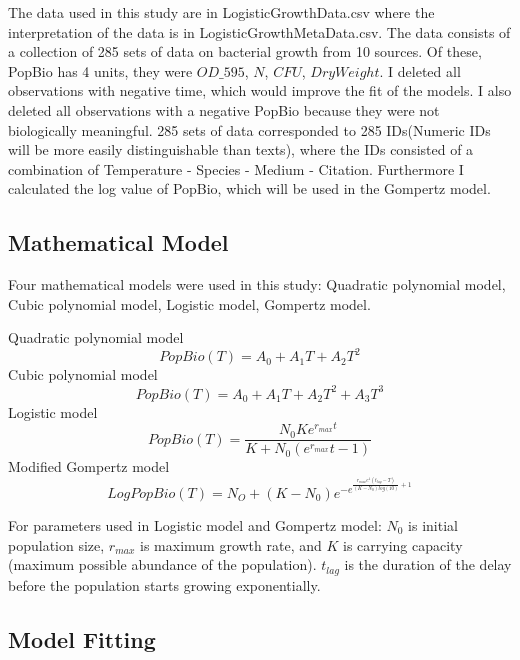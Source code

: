 \documentclass[11pt]{article}
\begin{document}
\begin{linenumbers}
    The data used in this study are in LogisticGrowthData.csv where the interpretation of the data is in LogisticGrowthMetaData.csv. The data consists of a collection of 285 sets of data on bacterial growth from 10 sources. Of these, PopBio has 4 units, they were $OD\_595$, $N$, $CFU$, $DryWeight$. I deleted all observations with negative time, which would improve the fit of the models. I also deleted all observations with a negative PopBio because they were not biologically meaningful. 285 sets of data corresponded to 285 IDs(Numeric IDs will be more easily distinguishable than texts), where the IDs consisted of a combination of Temperature - Species - Medium - Citation. Furthermore I calculated the log value of PopBio, which will be used in the Gompertz model.

      \subsection{Mathematical Model}

    Four mathematical models were used in this study:  Quadratic polynomial model, Cubic polynomial model, Logistic model, Gompertz model.

    Quadratic polynomial model
      \begin{equation} PopBio(T) = A_0 + A_1 T + A_2 T^2  \end{equation}
    Cubic polynomial model
      \begin{equation} PopBio(T) = A_0 + A_1 T + A_2 T^2 + A_3 T^3  \end{equation} 
    Logistic model
      \begin{equation} PopBio(T) = \frac{N_0 K e^{r_{max} t}}{K+N_0(e^{r_{max}} t - 1)}  \end{equation} 
    Modified Gompertz model \cite{zwietering1990modeling}
      \begin{equation} LogPopBio(T) = N_O + (K - N_0) e^{-e^{\frac{r_{max}  e^1  (t_{lag} - T)}{(K - N_0)  log(10)} + 1 }}  \end{equation}

    For parameters used in Logistic model and Gompertz model: $N_0$ is initial population size, $r_{max}$ is maximum growth rate, and $K$ is carrying capacity (maximum possible abundance of the population). $t_{lag}$ is the duration of the delay before the population starts growing exponentially.

      \subsection{Model Fitting}


\end{linenumbers}
\end{document}
